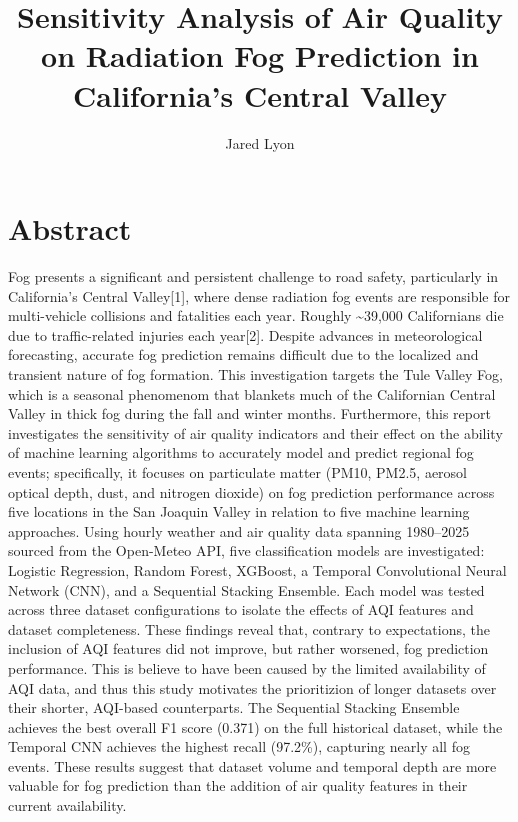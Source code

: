 \documentclass[
  letterpaper,
  DIV=11,
  numbers=noendperiod]{scrartcl}
\title{Sensitivity Analysis of Air Quality on Radiation Fog Prediction
in California's Central Valley}
\author{Jared Lyon}
\date{}
\renewcommand*\contentsname{Table of contents}
\newcommand\contentsname{Table of contents}
\begin{document}
\maketitle

\renewcommand*\contentsname{Table of contents}
{
\hypersetup{linkcolor=}
\setcounter{tocdepth}{3}
\tableofcontents
}

\section{Abstract}\label{abstract}

Fog presents a significant and persistent challenge to road safety,
particularly in California's Central Valley{[}1{]}, where dense
radiation fog events are responsible for multi-vehicle collisions and
fatalities each year. Roughly \textasciitilde39,000 Californians die due
to traffic-related injuries each year{[}2{]}. Despite advances in
meteorological forecasting, accurate fog prediction remains difficult
due to the localized and transient nature of fog formation. This
investigation targets the Tule Valley Fog, which is a seasonal
phenomenom that blankets much of the Californian Central Valley in thick
fog during the fall and winter months. Furthermore, this report
investigates the sensitivity of air quality indicators and their effect
on the ability of machine learning algorithms to accurately model and
predict regional fog events; specifically, it focuses on particulate
matter (PM10, PM2.5, aerosol optical depth, dust, and nitrogen dioxide)
on fog prediction performance across five locations in the San Joaquin
Valley in relation to five machine learning approaches. Using hourly
weather and air quality data spanning 1980--2025 sourced from the
Open-Meteo API, five classification models are investigated: Logistic
Regression, Random Forest, XGBoost, a Temporal Convolutional Neural
Network (CNN), and a Sequential Stacking Ensemble. Each model was tested
across three dataset configurations to isolate the effects of AQI
features and dataset completeness. These findings reveal that, contrary
to expectations, the inclusion of AQI features did not improve, but
rather worsened, fog prediction performance. This is believe to have
been caused by the limited availability of AQI data, and thus this study
motivates the prioritizion of longer datasets over their shorter,
AQI-based counterparts. The Sequential Stacking Ensemble achieves the
best overall F1 score (0.371) on the full historical dataset, while the
Temporal CNN achieves the highest recall (97.2\%), capturing nearly all
fog events. These results suggest that dataset volume and temporal depth
are more valuable for fog prediction than the addition of air quality
features in their current availability.
\end{document}
